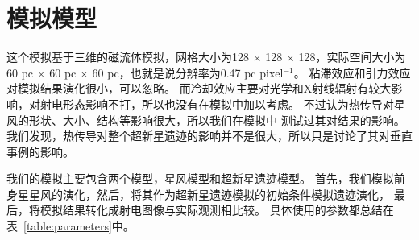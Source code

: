 \section{模拟模型}
\label{SWmod}
这个模拟基于三维的磁流体模拟，网格大小为128 $\times$ 128 $\times$ 128，实际空间大小为
60 pc $\times$ 60 pc $\times$ 60 pc，也就是说分辨率为0.47 pc pixel$^{-1}$。
粘滞效应和引力效应对模拟结果演化很小，可以忽略。
而冷却效应主要对光学和X射线辐射有较大影响，对射电形态影响不打，所以也没有在模拟中加以考虑。
不过\citet{Meyer2014}认为热传导对星风的形状、大小、结构等影响很大，所以我们在模拟中
测试过其对结果的影响。
我们发现，热传导对整个超新星遗迹的影响并不是很大，所以只是讨论了其对垂直事例的影响。

我们的模拟主要包含两个模型，星风模型和超新星遗迹模型。
首先，我们模拟前身星星风的演化，然后，将其作为超新星遗迹模拟的初始条件模拟遗迹演化，
最后，将模拟结果转化成射电图像与实际观测相比较。
具体使用的参数都总结在表~\ref{table:parameters}中。

